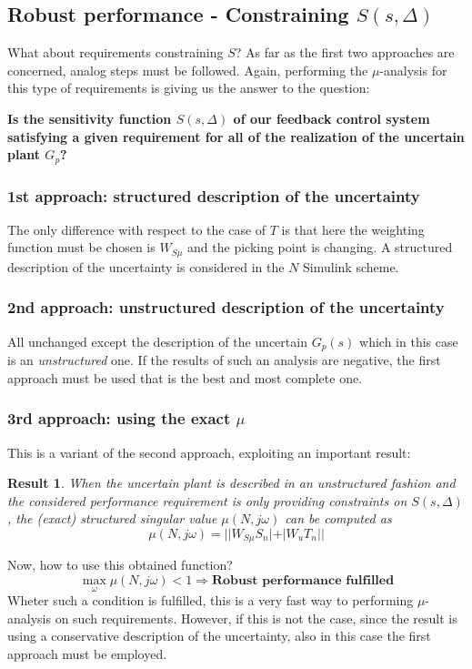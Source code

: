 \documentclass[a4paper, 12pt]{article}
\newtheorem*{result}{Result}
\begin{document}
\subsection{Robust performance - Constraining $S(s,\Delta)$}
What about requirements constraining $S$? As far as the first two approaches are concerned, analog steps must be followed. Again, performing the $\mu$-analysis for this type of requirements is giving us the answer to the question:
\begin{center}
    \textbf{Is the sensitivity function $S(s,\Delta)$ of our feedback control system satisfying a given requirement for 
    all of the realization of the uncertain plant $G_p$?}
\end{center}

\subsubsection{1st approach: structured description of the uncertainty}
The only difference with respect to the case of $T$ is that here the weighting function must be chosen is $W_{S\mu}$ and the picking point is changing. A structured description of the uncertainty is considered in the $N$ Simulink scheme.
\subsubsection{2nd approach: unstructured description of the uncertainty}
All unchanged except the description of the uncertain $G_p(s)$ which in this case is an \textit{unstructured} one. If the results of such an analysis are negative, the first approach must be used that is the best and most complete one.

\subsubsection{3rd approach: using the exact $\mu$}
This is a variant of the second approach, exploiting an important result: 

\begin{result}
When the uncertain plant is described in an unstructured fashion and the considered performance requirement is only providing constraints on $S(s,\Delta)$, the (exact) structured singular value $\mu(N,j\omega)$ can be computed as
\begin{equation}
    \mu(N,j\omega)=\big\vert \vert W_{S\mu}S_n\vert + \vert W_u T_n \vert \big\vert
\end{equation}
\end{result}
\noindent
Now, how to use this obtained function? 
\begin{equation*}
    \max_{\omega} \mu(N,j\omega) < 1 \Longrightarrow \textbf{Robust performance fulfilled}
\end{equation*}
Wheter such a condition is fulfilled, this is a very fast way to performing $\mu$-analysis on such requirements. However, if this is not the case, since the result is using a conservative description of the uncertainty, also in this case the first approach must be employed.
\end{document}
